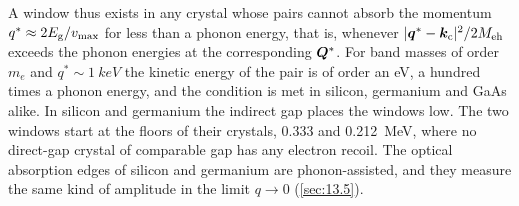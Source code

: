 A window thus exists in any crystal whose pairs cannot absorb the momentum $q^* \approx 2E_{\mathrm{g}}/v_{\mathrm{max}}$ for less than a phonon energy, that is, whenever $|\bm{q}^* - \bm{k}_{\mathrm{c}}|^2/2M_{\mathrm{eh}}$ exceeds the phonon energies at the corresponding $\bm{Q}^*$. For band masses of order $m_e$ and $q^* \sim \SI{1}{keV}$ the kinetic energy of the pair is of order an eV, a hundred times a phonon energy, and the condition is met in silicon, germanium and GaAs alike. In silicon and germanium the indirect gap places the windows low. The two windows start at the floors of their crystals, 0.333 and \SI{0.212}{MeV}, where no direct-gap crystal of comparable gap has any electron recoil. The optical absorption edges of silicon and germanium are phonon-assisted, and they measure the same kind of amplitude in the limit $q \to 0$ (\cref{sec:13.5}).
